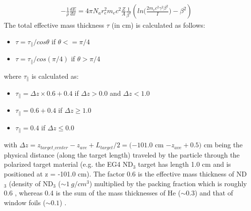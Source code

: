 \begin{eqnarray}
\label{eqBetheBlock}
-\frac{1}{\rho} \frac{dE}{dx} = 4\pi N_a r_e^2 m_e c^2 \frac{Z}{A} \frac{1}{\beta^2} \left( ln\bigg( \frac{2m_ec^2\gamma^2\beta^2}{I} \bigg) - \beta^2 \right) 
\end{eqnarray}
The total effective mass thickness $\tau$ (in cm) is calculated as follows: %
\begin{itemize}
\item $\tau = \tau_{\parallel}/cos\theta$ \quad if $\theta <= \pi/4$
\item $\tau = \tau_{\parallel}/cos(\pi/4)$ \quad if $\theta > \pi/4$    %
\end{itemize}
where $\tau_{\parallel}$ is calculated as:
\begin{itemize}
\item $\tau_{\parallel} = \Delta z \times 0.6 + 0.4$ \quad if $\Delta z > 0.0 $ and $\Delta z < 1.0 $
\item $\tau_{\parallel} = 0.6 + 0.4$ \quad if $\Delta z \geq  1.0$
\item $\tau_{\parallel} = 0.4$ \quad if $\Delta z \leq  0.0$
\end{itemize}
with $\Delta z = z_{target\_center} - z_{ave} + L_{target}/2 = (-101.0$ cm $ - z_{ave} + 0.5)$ cm being the physical distance (along the target length) traveled by the particle through the polarized target material (e.g. the EG4 ND$_3$ target has length 1.0 cm and is positioned at z = -101.0 cm). The factor 0.6 is the effective mass thickness of ND$_3$ (density of ND$_3$ ($\sim 1 ~g/cm^3$) %
multiplied by the packing fraction which is roughly 0.6  \cite{rfersch_th}, whereas 0.4 is the sum of the mass thicknesses of He ($\sim 0.3$) and that of window foils ($\sim 0.1$) \cite{nGuler_th}. %


